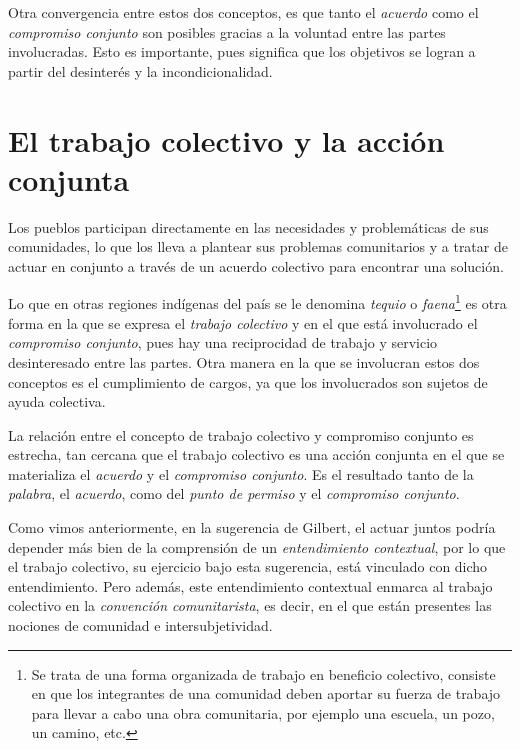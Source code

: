 \documentclass[oneside]{book}
\begin{document}
Otra convergencia entre estos dos conceptos, es que tanto el \textit{acuerdo} como el \textit{compromiso conjunto} son posibles gracias a la voluntad entre las partes involucradas. Esto es importante, pues significa que los objetivos se logran a partir del desinterés y la incondicionalidad.

\section{El trabajo colectivo y la acción conjunta}
	
Los pueblos participan directamente en las necesidades y problemáticas de sus comunidades, lo que los lleva a plantear sus problemas comunitarios y a tratar de actuar en conjunto a través de un acuerdo colectivo para encontrar una solución.
	
Lo que en otras regiones indígenas del país se le denomina \textit{tequio} o \textit{faena}\footnote{Se trata de una forma organizada de trabajo en beneficio colectivo, consiste en que los integrantes de una comunidad deben aportar su fuerza de trabajo para llevar a cabo una obra comunitaria, por ejemplo una escuela, un pozo, un camino, etc.} es otra forma en la que se expresa el \textit{trabajo colectivo} y en el que está involucrado el \textit{compromiso conjunto}, pues hay una reciprocidad de trabajo y servicio desinteresado entre las partes. Otra manera en la que se involucran estos dos conceptos es el cumplimiento de cargos, ya que los involucrados son sujetos de ayuda colectiva. 
	
La relación entre el concepto de trabajo colectivo y compromiso conjunto es estrecha, tan cercana que el trabajo colectivo es una acción conjunta en el que se materializa el \textit{acuerdo} y el \textit{compromiso conjunto}. Es el resultado tanto de la \textit{palabra}, el \textit{acuerdo}, como del \textit{punto de permiso} y el \textit{compromiso conjunto}.

Como vimos anteriormente, en la sugerencia de Gilbert, el actuar juntos podría depender más bien de la comprensión de un \textit{entendimiento contextual}, por lo que el trabajo colectivo, su ejercicio bajo esta sugerencia, está vinculado con dicho entendimiento. Pero además, este entendimiento contextual enmarca al trabajo colectivo en la \textit{convención comunitarista}, es decir, en el que están presentes las nociones de comunidad e intersubjetividad.
\end{document}
